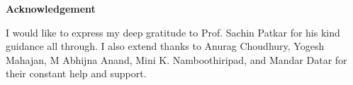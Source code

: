 \begin{Acknowledgement}
    \noindent
    \begin{center}
        {\Large \textbf{Acknowledgement}}\\
    \end{center}
    I would like to express my deep gratitude to Prof. Sachin Patkar for his kind guidance all through. I also extend thanks to Anurag Choudhury, Yogesh Mahajan, M Abhijna Anand, Mini K. Namboothiripad, and Mandar Datar for their constant help and support.
    \begin{flushright}
    \end{flushright}

\end{Acknowledgement}
